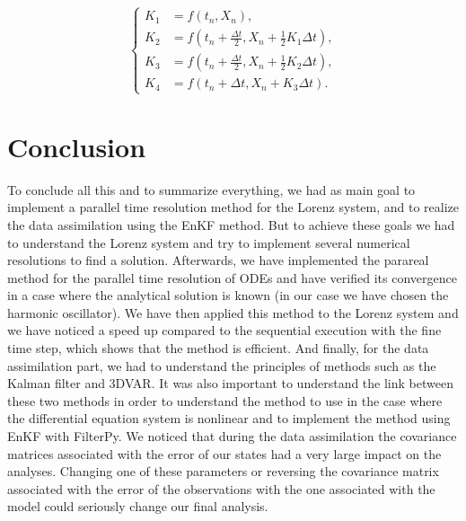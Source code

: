 \documentclass[12pt]{article}
\begin{document}
		$$\left\{\begin{aligned}
			K_1&=f(t_n,X_n) , \\
			K_2&=f\left(t_n+\frac{\Delta t}{2},X_n+\frac{1}{2} K_1\Delta t\right) , \\
			K_3&=f\left(t_n+\frac{\Delta t}{2},X_n+\frac{1}{2} K_2\Delta t\right) , \\
			K_4&=f\left(t_n+\Delta t,X_n+K_3\Delta t\right) .
		\end{aligned}\right.$$
	
    

	
	\newpage
	
	
	
	\newpage
	
		

	\newpage

	\section{Conclusion}
	\noindent To conclude all this and to summarize everything, we had as main goal to implement a parallel time resolution method for the Lorenz system, and to realize the data assimilation using the EnKF method. But to achieve these goals we had to understand the Lorenz system and try to implement several numerical resolutions to find a solution. Afterwards, we have implemented the parareal method for the parallel time resolution of ODEs and have verified its convergence in a case where the analytical solution is known (in our case we have chosen the harmonic oscillator). We have then applied this method to the Lorenz system and we have noticed a speed up compared to the sequential execution with the fine time step, which shows that the method is efficient. And finally, for the data assimilation part, we had to understand the principles of methods such as the Kalman filter and 3DVAR. It was also important to understand the link between these two methods in order to understand the method to use in the case where the differential equation system is nonlinear and to implement the method using EnKF with FilterPy. We noticed that during the data assimilation the covariance matrices associated with the error of our states had a very large impact on the analyses. Changing one of these parameters or reversing the covariance matrix associated with the error of the observations with the one associated with the model could seriously change our final analysis. 
	
	\newpage
	
	\appendix
	
		
	
	\newpage	
	
	\printbibliography[keyword=ref,title={References}]
	
	\newpage
	
	\printbibliography[keyword=doc,title={Documentation}]
\end{document}

